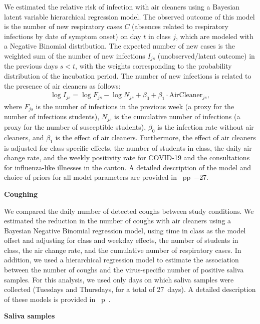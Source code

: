 \documentclass[fleqn,11pt]{wlscirep}
\begin{document}
\noindent We estimated the relative risk of infection with air cleaners using a Bayesian latent variable hierarchical regression model. The observed outcome of this model is the number of new respiratory cases $C$ (absences related to respiratory infections by date of symptom onset) on day $t$ in class $j$, which are modeled with a Negative Binomial distribution. The expected number of new cases is the weighted sum of the number of new infections $I_{js}$ (unobserved/latent outcome) in the previous days $s<t$, with the weights corresponding to the probability distribution of the incubation period. The number of new infections is related to the presence of air cleaners as follows:
\begin{align}
    \log I_{js} = \log F_{js} - \log N_{js} + \beta_0 + \beta_1 \cdot \text{AirCleaner}_{js},
\end{align}
where $F_{js}$ is the number of infections in the previous week (a proxy for the number of infectious students), $N_{js}$ is the cumulative number of infections (a proxy for the number of susceptible students), $\beta_0$ is the infection rate without air cleaners, and $\beta_1$ is the effect of air cleaners. Furthermore, the effect of air cleaners is adjusted for class-specific effects, the number of students in class, the daily air change rate, and the weekly positivity rate for COVID-19 and the consultations for influenza-like illnesses in the canton. A detailed description of the model and choice of priors for all model parameters are provided in \supp~pp~$-$27. \medskip

\noindent\textbf{Coughing} \smallskip

\noindent We compared the daily number of detected coughs between study conditions. We estimated the reduction in the number of coughs with air cleaners using a Bayesian Negative Binomial regression model, using time in class as the model offset and adjusting for class and weekday effects, the number of students in class, the air change rate, and the cumulative number of respiratory cases. In addition, we used a hierarchical regression model to estimate the association between the number of coughs and the virus-specific number of positive saliva samples. For this analysis, we used only days on which saliva samples were collected (Tuesdays and Thursdays, for a total of 27~days). A detailed description of these models is provided in \supp~p~.  \medskip

\noindent\textbf{Saliva samples} \smallskip
\end{document}
